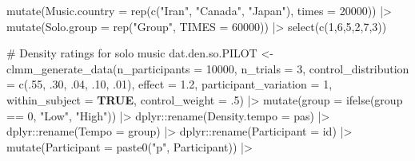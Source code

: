 \documentclass[
  bookmarksnumbered]{article}
\newenvironment{Shaded}{\begin{snugshade}}{\end{snugshade}}
\newcommand{\AttributeTok}[1]{\textcolor[rgb]{0.80,0.80,0.80}{#1}}
\newcommand{\CommentTok}[1]{\textcolor[rgb]{0.50,0.62,0.50}{#1}}
\newcommand{\ConstantTok}[1]{\textcolor[rgb]{0.86,0.64,0.64}{\textbf{#1}}}
\newcommand{\DecValTok}[1]{\textcolor[rgb]{0.86,0.86,0.80}{#1}}
\newcommand{\FloatTok}[1]{\textcolor[rgb]{0.75,0.75,0.82}{#1}}
\newcommand{\FunctionTok}[1]{\textcolor[rgb]{0.94,0.94,0.56}{#1}}
\newcommand{\NormalTok}[1]{\textcolor[rgb]{0.80,0.80,0.80}{#1}}
\newcommand{\OtherTok}[1]{\textcolor[rgb]{0.94,0.94,0.56}{#1}}
\newcommand{\SpecialCharTok}[1]{\textcolor[rgb]{0.86,0.64,0.64}{#1}}
\newcommand{\StringTok}[1]{\textcolor[rgb]{0.80,0.58,0.58}{#1}}
\begin{document}
\begin{Shaded}
\begin{Highlighting}[]
  \FunctionTok{mutate}\NormalTok{(}\AttributeTok{Music.country =} \FunctionTok{rep}\NormalTok{(}\FunctionTok{c}\NormalTok{(}\StringTok{"Iran"}\NormalTok{, }\StringTok{"Canada"}\NormalTok{, }\StringTok{"Japan"}\NormalTok{), }\AttributeTok{times =} \DecValTok{20000}\NormalTok{)) }\SpecialCharTok{|\textgreater{}}
  \FunctionTok{mutate}\NormalTok{(}\AttributeTok{Solo.group =} \FunctionTok{rep}\NormalTok{(}\StringTok{"Group"}\NormalTok{, }\AttributeTok{TIMES =} \DecValTok{60000}\NormalTok{)) }\SpecialCharTok{|\textgreater{}}
  \FunctionTok{select}\NormalTok{(}\FunctionTok{c}\NormalTok{(}\DecValTok{1}\NormalTok{,}\DecValTok{6}\NormalTok{,}\DecValTok{5}\NormalTok{,}\DecValTok{2}\NormalTok{,}\DecValTok{7}\NormalTok{,}\DecValTok{3}\NormalTok{))}

\CommentTok{\# Density ratings for solo music}
\NormalTok{dat.den.so.PILOT }\OtherTok{\textless{}{-}} \FunctionTok{clmm\_generate\_data}\NormalTok{(}\AttributeTok{n\_participants =} \DecValTok{10000}\NormalTok{,}
                                 \AttributeTok{n\_trials =} \DecValTok{3}\NormalTok{,}
                                 \AttributeTok{control\_distribution =} \FunctionTok{c}\NormalTok{(.}\DecValTok{55}\NormalTok{, .}\DecValTok{30}\NormalTok{, .}\DecValTok{04}\NormalTok{, .}\DecValTok{10}\NormalTok{, .}\DecValTok{01}\NormalTok{),}
                                 \AttributeTok{effect =} \FloatTok{1.2}\NormalTok{,}
                                 \AttributeTok{participant\_variation =} \DecValTok{1}\NormalTok{,}
                                 \AttributeTok{within\_subject =} \ConstantTok{TRUE}\NormalTok{,}
                                 \AttributeTok{control\_weight =}\NormalTok{ .}\DecValTok{5}\NormalTok{) }\SpecialCharTok{|\textgreater{}}
  \FunctionTok{mutate}\NormalTok{(}\AttributeTok{group =} \FunctionTok{ifelse}\NormalTok{(group }\SpecialCharTok{==} \DecValTok{0}\NormalTok{, }\StringTok{"Low"}\NormalTok{, }\StringTok{"High"}\NormalTok{)) }\SpecialCharTok{|\textgreater{}}
\NormalTok{  dplyr}\SpecialCharTok{::}\FunctionTok{rename}\NormalTok{(}\AttributeTok{Density.tempo =}\NormalTok{ pas) }\SpecialCharTok{|\textgreater{}}
\NormalTok{  dplyr}\SpecialCharTok{::}\FunctionTok{rename}\NormalTok{(}\AttributeTok{Tempo =}\NormalTok{ group) }\SpecialCharTok{|\textgreater{}}
\NormalTok{  dplyr}\SpecialCharTok{::}\FunctionTok{rename}\NormalTok{(}\AttributeTok{Participant =}\NormalTok{ id) }\SpecialCharTok{|\textgreater{}}
  \FunctionTok{mutate}\NormalTok{(}\AttributeTok{Participant =} \FunctionTok{paste0}\NormalTok{(}\StringTok{"p"}\NormalTok{, Participant)) }\SpecialCharTok{|\textgreater{}}

\end{Highlighting}
\end{Shaded}
\end{document}
